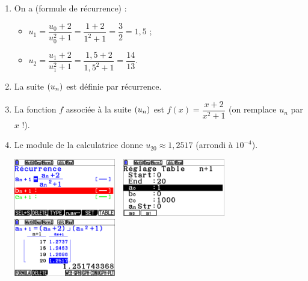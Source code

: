 \documentclass[a4paper,11pt]{article}
\begin{document}
\begin{enumerate}[itemsep=0pt]
	\item On a (formule de récurrence) :
	\begin{itemize}
		\item $u_1=\dfrac{u_0+2}{u_0^2+1}=\dfrac{1+2}{1^2+1}=\dfrac{3}{2}=1,5$ ;
		\item $u_2=\dfrac{u_1+2}{u_1^2+1}=\dfrac{1,5+2}{1,5^2+1}=\dfrac{14}{13}$.
	\end{itemize}
	\item La suite $\left( u_n \right)$ est définie par récurrence.
	\item La fonction $f$ associée à la suite $\left( u_n \right)$ est $f(x)=\dfrac{x+2}{x^2+1}$ (on remplace $u_n$ par $x$ !).
	\item Le module  de la calculatrice donne $u_{20}\approx 1,2517$ (arrondi à $10^{-4}$).
	\begin{center}
		\includegraphics[height=2.5cm]{chap02_exos_corr_4a}~~\includegraphics[height=2.5cm]{chap02_exos_corr_4b}~~\includegraphics[height=2.5cm]{chap02_exos_corr_4c}
	\end{center}
\end{enumerate}

\medskip

\end{document}
